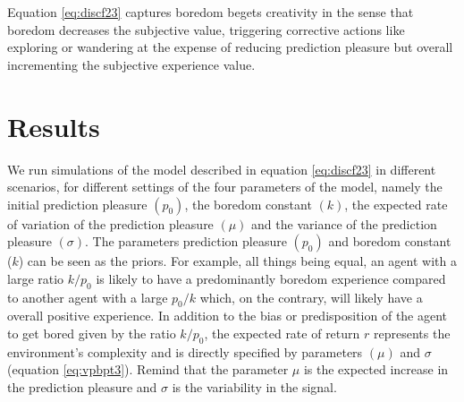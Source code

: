 \documentclass[11pt, onecolumn]{article}
\begin{document}
Equation \ref{eq:discf23} captures boredom begets creativity in the sense that boredom decreases the subjective value, triggering corrective actions like exploring or wandering at the expense of reducing prediction pleasure but overall incrementing the subjective experience value.

\section{Results}
\label{se:re}

We run simulations of the model described in equation \ref{eq:discf23} in different scenarios, for different settings of the four parameters of the model, namely the initial prediction pleasure $(p_0)$, the boredom constant $(k)$, the expected rate of variation of the prediction pleasure $(\mu)$ and the variance of the prediction pleasure $(\sigma)$. The parameters prediction pleasure $(p_0)$ and boredom constant ($k$) can be seen as the priors. For example, all things being equal, an agent with a large ratio $k/p_0$ is likely to have a predominantly boredom experience compared to another agent with a large $p_0/k$ which, on the contrary, will likely have a overall positive experience. In addition to the bias or predisposition of the agent to get bored given by the ratio $k/p_0$, the expected rate of return $r$ represents the environment's complexity and is directly specified by parameters $(\mu)$ and $\sigma$ (equation \ref{eq:vpbpt3}). Remind that the parameter $\mu$ is the expected increase in the prediction pleasure and $\sigma$ is the variability in the signal.
\end{document}
